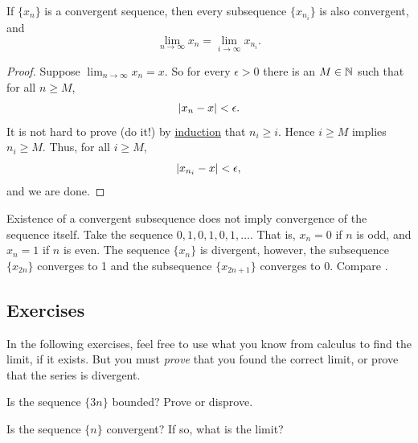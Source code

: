 \begin{prop} \label{prop:seqtosubseq}
If $\{ x_n \}$ is a convergent sequence,
then every subsequence $\{ x_{n_i} \}$ is also convergent, and
\begin{equation*}
\lim_{n\to \infty} x_n = 
\lim_{i\to \infty} x_{n_i} .
\end{equation*}
\end{prop}

\begin{proof}
Suppose $\lim_{n\to \infty} x_n = x$.  So for every
$\epsilon > 0$ there is an $M \in {\mathbb{N}}$ such that for all $n \geq M$,
\begin{equation*}
\left\lvert {x_n - x} \right\rvert < \epsilon .
\end{equation*}
It is not hard to prove (do it!) by \hyperref[induction:thm]{induction} that
$n_i \geq i$.  Hence $i \geq M$ implies $n_i \geq M$.  Thus,
for all $i \geq M$,
\begin{equation*}
\left\lvert {x_{n_i} - x} \right\rvert < \epsilon ,
\end{equation*}
and we are done.
\end{proof}

\begin{example}
Existence of a convergent subsequence does not imply
convergence of the sequence itself.
Take the sequence $0,1,0,1,0,1,\ldots$.  That is,
$x_n = 0$ if $n$ is odd, and $x_n = 1$ if $n$ is even.  The sequence
$\{ x_n \}$ is divergent, however, the subsequence
$\{ x_{2n} \}$ converges to 1 and the subsequence
$\{ x_{2n+1} \}$ converges to 0.  Compare .
\end{example}

\subsection{Exercises}

\begin{exnote}
In the following exercises, feel free to use what you know from calculus to
find the limit, if it exists.  But you must \emph{prove}
that you
found the correct limit, or prove that the series is divergent.
\end{exnote}

\begin{exercise}
Is the sequence
$\{ 3n \}$
bounded?  Prove or disprove.
\end{exercise}

\begin{exercise}
Is the sequence
$\{ n \}$
convergent?  If so, what is the limit?
\end{exercise}

